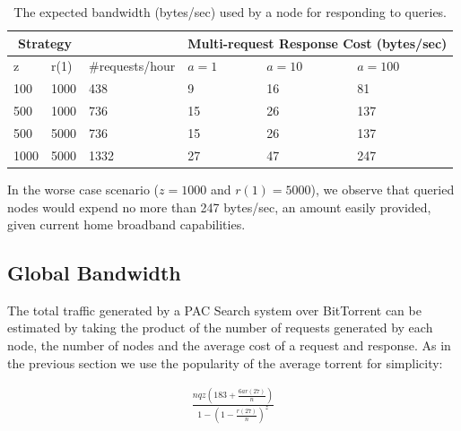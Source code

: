     \begin{table}
        \renewcommand{\arraystretch}{1.3}
        \caption{The expected bandwidth (bytes/sec) used by a node for responding to queries.}
        \label{tab:single_node_response_bandwidth}
        \centering
        \begin{tabular}{l|l|l|l|l|l}
            \hline
            \multicolumn{2}{c|}{Strategy} &               ~ & \multicolumn{3}{|c}{Multi-request Response Cost (bytes/sec)} \\ \hline
              z &                     r(1) & \#requests/hour & $a=1$ & $a=10$ &                                      $a=100$ \\ \hline
            100 &                     1000 &             438 &     9 &     16 &                                           81 \\
            500 &                     1000 &             736 &    15 &     26 &                                          137 \\
            500 &                     5000 &             736 &    15 &     26 &                                          137 \\
           1000 &                     5000 &            1332 &    27 &     47 &                                          247 \\
            \hline
        \end{tabular}
    \end{table}

    In the worse case scenario ($z=1000$ and $r(1)=5000$), we observe that queried nodes would expend no more than 247 bytes/sec, an amount easily provided, given current home broadband capabilities.

\subsection{Global Bandwidth}

    The total traffic generated by a PAC Search system over BitTorrent can be estimated by taking the product of the number of requests generated by each node, the number of nodes and the average cost of a request and response. As in the previous section we use the popularity of the average torrent for simplicity:

    \begin{align}
        \frac{nqz(183 + \frac{6ar(27)}{n})}{1-(1-\frac{r(27)}{n})^z}
        \label{eq:overheads_global}
    \end{align}


